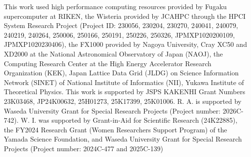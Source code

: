 \documentclass[
reprint,
superscriptaddress,
amsmath,amssymb,
aps,
prl
]{revtex4-2}
\begin{document}
\begin{acknowledgments}
This work used high performance computing resources provided by Fugaku supercomputer at RIKEN, the Wisteria provided by JCAHPC through the HPCI System Research Project (Project ID: 230056, 230204, 230270, 240041, 240079, 240219, 240264, 250006, 250166, 250191, 250226, 250326, JPMXP1020200109, JPMXP1020230406), the FX1000 provided by Nagoya University, Cray XC50 and XD2000 at the National Astronomical Observatory of Japan (NAOJ), the Computing Research Center at the High Energy Accelerator Research Organization (KEK), Japan Lattice Data Grid (JLDG) on Science Information Network (SINET) of National Institute of Informatics (NII), Yukawa Institute of Theoretical Physics.
This work is supported by JSPS KAKENHI Grant Numbers 23K03468, JP24K00632, 25H01273, 25K17399, 25K01006.
R. A. is supported by Waseda University Grant for Special Research Projects (Project number: 2026C-742).
W. I. was supported by Grant-in-Aid for Scientific Research
(24K22885), the FY2024 Research Grant (Women Researchers Support
Program) of the Yamada Science Foundation, and Waseda University Grant
for Special Research Projects (Project number: 2024C-477 and
2025C-139)
\end{acknowledgments}












\end{document}
